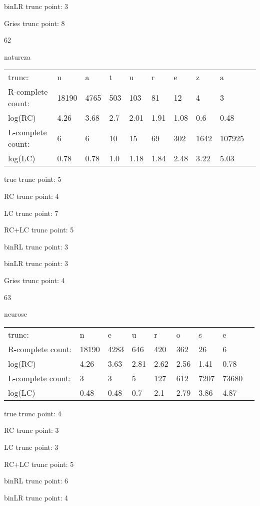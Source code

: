 \documentclass[10pt]{article}
\begin{document}
binLR trunc point: 3

Gries trunc point: 8

\vspace{1em}

62

natureza

\begin{tabular}{l|lllllllll}
trunc: & n & a & t & u & r & e & z & a & \\ 
R-complete count: & 18190 & 4765 & 503 & 103 & 81 & 12 & 4 & 3 & \\ 
log(RC) & 4.26 & 3.68 & 2.7 & 2.01 & 1.91 & 1.08 & 0.6 & 0.48 & \\ 
L-complete count: & 6 & 6 & 10 & 15 & 69 & 302 & 1642 & 107925 & \\ 
log(LC) & 0.78 & 0.78 & 1.0 & 1.18 & 1.84 & 2.48 & 3.22 & 5.03 & \\ 
\end{tabular}

true trunc point: 5

RC trunc point: 4

LC trunc point: 7

RC+LC trunc point: 5

binRL trunc point: 3

binLR trunc point: 3

Gries trunc point: 4

\vspace{1em}

63

neurose

\begin{tabular}{l|llllllll}
trunc: & n & e & u & r & o & s & e & \\ 
R-complete count: & 18190 & 4283 & 646 & 420 & 362 & 26 & 6 & \\ 
log(RC) & 4.26 & 3.63 & 2.81 & 2.62 & 2.56 & 1.41 & 0.78 & \\ 
L-complete count: & 3 & 3 & 5 & 127 & 612 & 7207 & 73680 & \\ 
log(LC) & 0.48 & 0.48 & 0.7 & 2.1 & 2.79 & 3.86 & 4.87 & \\ 
\end{tabular}

true trunc point: 4

RC trunc point: 3

LC trunc point: 3

RC+LC trunc point: 5

binRL trunc point: 6

binLR trunc point: 4
\end{document}
